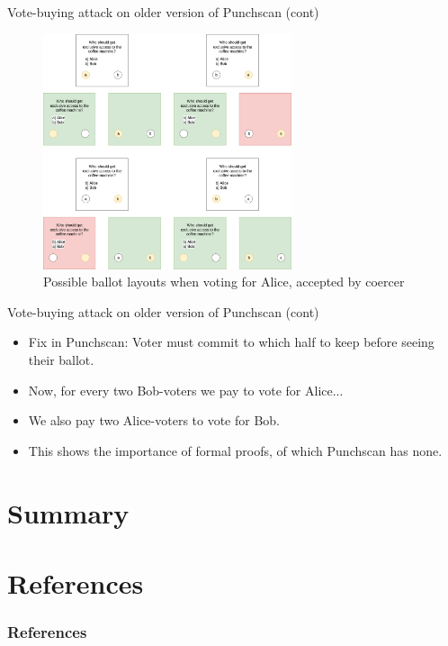 \documentclass{beamer}
\begin{document}
\begin{frame}{Vote-buying attack on older version of Punchscan (cont)}
	\begin{figure}
		\centering
		\includegraphics[width=0.65\textwidth]{../resources/vote_buying_split_highlighted_alice.drawio.png}
		\caption{Possible ballot layouts when voting for Alice, accepted by coercer}
	\end{figure}
\end{frame}

\begin{frame}{Vote-buying attack on older version of Punchscan (cont)}
	\begin{itemize}
		\item Fix in Punchscan: Voter must commit to which half to keep before seeing their ballot.
		\item Now, for every two Bob-voters we pay to vote for Alice...
		\item We also pay two Alice-voters to vote for Bob.
		\item This shows the importance of formal proofs, of which Punchscan has none.
	\end{itemize}
\end{frame}

\section{Summary}


\section{References}

\begin{frame}[allowframebreaks]
	\frametitle{References}
	\printbibliography
\end{frame}
\end{document}
